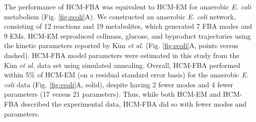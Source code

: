 \documentclass[10pt,twocolumn,twoside,final]{IEEEtran}
\begin{document}

The performance of HCM-FBA was equivalent to HCM-EM for anaerobic \textit{E. coli} metabolism (Fig. \ref{fig:ecoli}A).
We constructed an anaerobic \textit{E. coli} network, consisting of 12 reactions and 19 metabolites, which generated 7 FBA modes and 9 EMs.
HCM-EM reproduced cellmass, glucose, and byproduct trajectories using the kinetic parameters reported by Kim \textit{et al.} \cite{2008_kim_varner_ramkrishna_BiotechProg} (Fig. \ref{fig:ecoli}A, points versus dashed).
HCM-FBA model parameters were estimated in this study from the Kim \textit{et al.} data set using simulated annealing.
Overall, HCM-FBA performed within 5\% of HCM-EM (on a residual standard error basis) for the anaerobic \textit{E. coli} data (Fig. \ref {fig:ecoli}A, solid),
despite having 2 fewer modes and 4 fewer parameters (17 versus 21 parameters).
Thus, while both HCM-EM and HCM-FBA described the experimental data, HCM-FBA did so with fewer modes and parameters.
\end{document}
